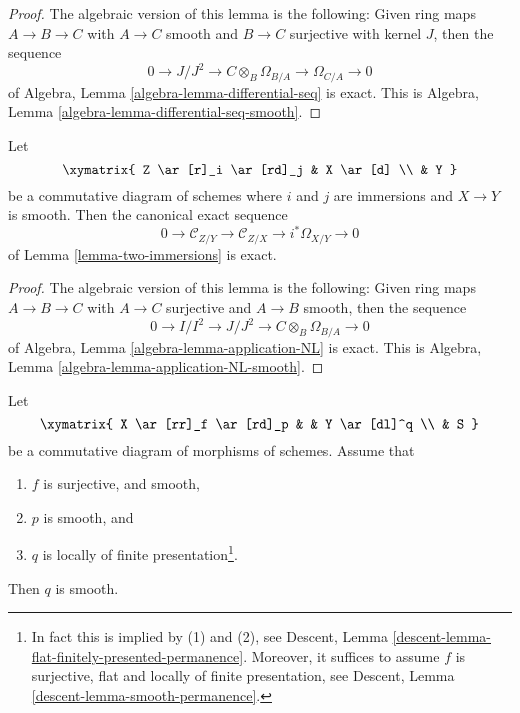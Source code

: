 \begin{proof}
The algebraic version of this lemma is the following:
Given ring maps $A \to B \to C$ with $A \to C$ smooth and $B \to C$
surjective with kernel $J$, then the sequence
$$
0 \to J/J^2 \to C \otimes_B \Omega_{B/A} \to \Omega_{C/A} \to 0
$$
of
Algebra, Lemma \ref{algebra-lemma-differential-seq}
is exact. This is
Algebra, Lemma \ref{algebra-lemma-differential-seq-smooth}.
\end{proof}

\begin{lemma}
\label{lemma-two-immersions-smooth}
Let
$$
\xymatrix{
Z \ar[r]_i \ar[rd]_j & X \ar[d] \\
& Y
}
$$
be a commutative diagram of schemes where $i$ and $j$ are immersions
and $X \to Y$ is smooth.
Then the canonical exact sequence
$$
0 \to  \mathcal{C}_{Z/Y} \to \mathcal{C}_{Z/X} \to i^*\Omega_{X/Y} \to 0
$$
of
Lemma \ref{lemma-two-immersions}
is exact.
\end{lemma}

\begin{proof}
The algebraic version of this lemma is the following:
Given ring maps $A \to B \to C$ with $A \to C$ surjective and $A \to B$
smooth, then the sequence
$$
0 \to I/I^2 \to J/J^2 \to C \otimes_B \Omega_{B/A} \to 0
$$
of
Algebra, Lemma \ref{algebra-lemma-application-NL}
is exact. This is
Algebra, Lemma \ref{algebra-lemma-application-NL-smooth}.
\end{proof}

\begin{lemma}
\label{lemma-smooth-permanence}
Let
$$
\xymatrix{
X \ar[rr]_f \ar[rd]_p & &
Y \ar[dl]^q \\
& S
}
$$
be a commutative diagram of morphisms of schemes. Assume that
\begin{enumerate}
\item $f$ is surjective, and smooth,
\item $p$ is smooth, and
\item $q$ is locally of finite presentation\footnote{In fact this
is implied by (1) and (2), see
Descent, Lemma \ref{descent-lemma-flat-finitely-presented-permanence}.
Moreover, it suffices to assume $f$ is surjective, flat and locally
of finite presentation, see
Descent, Lemma \ref{descent-lemma-smooth-permanence}.}.
\end{enumerate}
Then $q$ is smooth.
\end{lemma}

